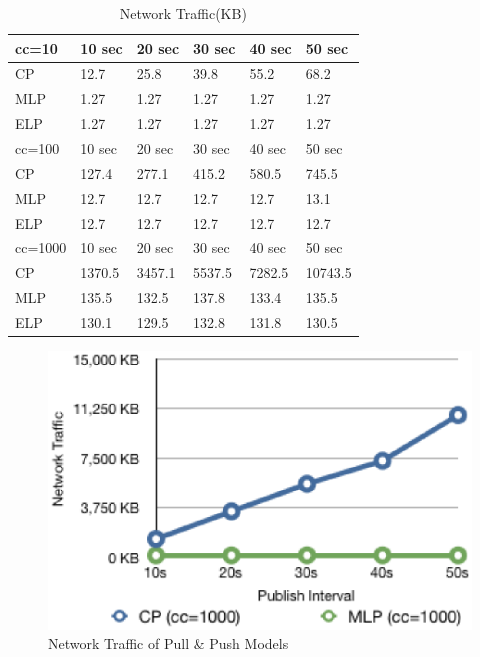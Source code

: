 \begin{table}
\centering \caption{\label{tb:traffic} Network Traffic(KB)}
\begin{tabular}{|l|l|l|l|l|l|}
    \hline cc=10& 10 sec & 20 sec & 30 sec & 40 sec & 50 sec \\
    \hline CP & 12.7 & 25.8 & 39.8 & 55.2 & 68.2 \\
    \hline MLP & 1.27 & 1.27 & 1.27 & 1.27 & 1.27 \\
    \hline ELP & 1.27 & 1.27 & 1.27 & 1.27 & 1.27 \\
    \hline
    \hline cc=100& 10 sec & 20 sec & 30 sec & 40 sec & 50 sec \\
    \hline CP & 127.4 & 277.1 & 415.2 & 580.5 & 745.5 \\
    \hline MLP & 12.7 & 12.7 & 12.7 & 12.7 & 13.1 \\
    \hline ELP & 12.7 & 12.7 & 12.7 & 12.7 & 12.7 \\
    \hline
    \hline cc=1000 & 10 sec & 20 sec & 30 sec & 40 sec & 50 sec \\
    \hline CP & 1370.5 & 3457.1 & 5537.5 & 7282.5 & 10743.5 \\
    \hline MLP & 135.5 & 132.5 & 137.8 & 133.4 & 135.5 \\
    \hline ELP & 130.1 & 129.5 & 132.8 & 131.8 & 130.5 \\
    \hline
\end{tabular}
\end{table}

\begin{figure}[htb!]
\centering%
    \includegraphics[scale=0.70]{figures/io.eps}
    \caption{Network Traffic of Pull \& Push Models}
    \label{fig:traffic}
\end{figure}


